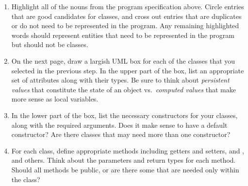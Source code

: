 \begin{enumerate}

\item Highlight all of the nouns from the program specification above.
Circle entries that are good candidates for classes, and cross out entries that are duplicates or do not need to be represented in the program.
Any remaining highlighted words should represent entities that need to be represented in the program but should not be classes.

\item On the next page, draw a largish UML box for each of the classes that you selected in the previous step.
In the upper part of the box, list an appropriate set of attributes along with their types.
Be sure to think about \textit{persistent values} that constitute the state of an object vs.\ \textit{computed values} that make more sense as local variables.

\item In the lower part of the box, list the necessary constructors for your classes, along with the required arguments.
Does it make sense to have a default constructor?
Are there classes that may need more than one constructor?

\item For each class, define appropriate methods including getters and setters,  and , and others.
Think about the parameters and return types for each method.
Should all methods be public, or are there some that are needed only within the class?



\end{enumerate}

\newpage
\null

